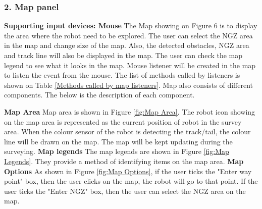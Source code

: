 \subsubsection{2. Map panel}
\textbf{Supporting input devices: Mouse}
The Map showing on Figure 6 is to display the area where the robot need to be explored. The user can select the NGZ area in the map and change size of the map. Also, the detected obstacles, NGZ area and track line will also be displayed in the map. The user can check the map legend to see what it looks in the map. Mouse listener will be created in the map to listen the event from the mouse. The list of methods called by listeners is shown on Table \ref{Methods called by map listeners}. Map also consists of different components. The below is the description of each component.

\textbf{Map Area}
Map area is shown in Figure \ref{fig:Map Area}. The robot icon showing on the map area is represented as the current position of robot in the survey area. When the colour sensor of the robot is detecting the track/tail, the colour line will be drawn on the map. The map will be kept updating during the surveying.
\textbf{Map legends}  
The map legends are shown in Figure \ref{fig:Map Legends}. They provide a method of identifying items on the map area.
\textbf{Map Options}
As shown in Figure \ref{fig:Map Options}, if the user ticks the "Enter way point" box, then the user clicks on the map, the robot will go to that point. If the user ticks the "Enter NGZ" box, then the user can select the NGZ area on the map.

